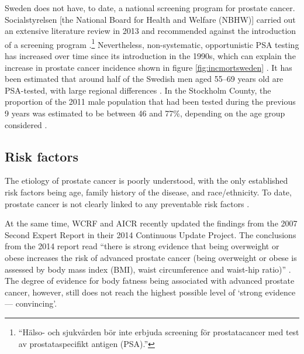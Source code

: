 Sweden does not have, to date, a national screening program for prostate cancer. Socialstyrelsen [the National Board for Health and Welfare (NBHW)] carried out an extensive literature review in 2013 and recommended against the introduction of a screening program \citep{socialstyrelsen_screening_2013}.\footnote{``Hälso- och sjukvården bör inte erbjuda screening för prostatacancer med test av prostataspecifikt antigen (PSA).''} Nevertheless, non-systematic, opportunistic PSA testing has increased over time since its introduction in the 1990s, which can explain the increase in prostate cancer incidence shown in figure \ref{fig:incmortsweden} \citep{jonsson_uptake_2011, nordstrom_prostatespecific_2013, socialstyrelsen_screening_2013}. It has been estimated that around half of the Swedish men aged 55--69 years old are PSA-tested, with large regional differences \citep{jonsson_uptake_2011}. In the Stockholm County, the proportion of the 2011 male population that had been tested during the previous 9 years was estimated to be between 46 and 77\%, depending on the age group considered \citep{nordstrom_prostatespecific_2013}.


\subsection{Risk factors}
The etiology of prostate cancer is poorly understood, with the only established risk factors being age, family history of the disease, and race/ethnicity. To date, prostate cancer is not clearly linked to any preventable risk factors \citep{cogliano_preventable_2011,discacciati_lifestyle_2014, wcrf_continuous_2014}. 

At the same time, WCRF and AICR recently updated the findings from the 2007 Second Expert Report in their 2014 Continuous Update Project. The conclusions from the 2014 report read ``there is strong evidence that being overweight or obese increases the risk of advanced prostate cancer (being overweight or obese is assessed by body mass index (BMI), waist circumference and waist-hip ratio)'' \citep{wcrf_continuous_2014}. The degree of evidence for body fatness being associated with advanced prostate cancer, however, still does not reach the highest possible level of `strong evidence --- convincing'.

